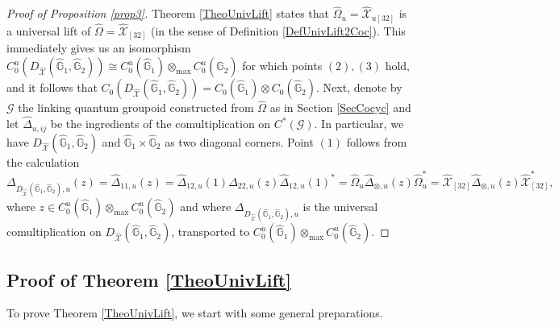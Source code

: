 \documentclass[reqno]{amsart}
\numberwithin{equation}{section}
\newcommand{\G}{\mathbb{G}}
\newcommand{\msG}{\mathscr{G}}
\newcommand{\mc}{\mathcal}
\newcommand{\wh}{\widehat}
\begin{document}
\begin{proof}[Proof of Proposition \ref{prop3}]
Theorem \ref{TheoUnivLift} states that $\hat{\Omega}_u=\wh{\mc{X}}_{u[32]}$ is a universal lift of $\hat{\Omega}=\hat{\mc{X}}_{[32]}$ (in the sense of Definition \ref{DefUnivLift2Coc}). This immediately gives us an isomorphism $C_0^u( D_{\wh{\mc{X}}}(\hat{\G}_1,\hat{\G}_2) )\cong C^u_0(\hat{\G}_1)\otimes_{\max} C^u_0(\hat{\G}_2)$ for which points $(2),(3)$ hold, and it follows that $C_0 (D_{\wh{\mc{X}}}(\hat{\G}_1,\hat{\G}_2))=C_{0}(\hat{\G}_1)\otimes C_{0}(\hat{\G}_2)$. Next, denote by $\msG$ the linking quantum groupoid constructed from $\hat{\Omega}$ as in Section \ref{SecCocyc} and let $\hat{\Delta}_{u,ij}$ be the ingredients of the comultiplication on $C^*(\msG)$. In particular, we have $D_{\wh{\mc{X}}}(\hat{\G}_1,\hat{\G}_2)$ and $\hat{\G}_1\times \hat{\G}_2$ as two diagonal corners. Point $(1)$ follows from the calculation
\[
\Delta_{D_{\wh{\mc{X}}}(\hat{\G}_1,\hat{\G}_2),u}(z)=
\hat{\Delta}_{11,u}(z)=
\hat{\Delta}_{12,u}(1)
\hat{\Delta}_{22,u}(z)
\hat{\Delta}_{12,u}(1)^*=
\hat{\Omega}_u\hat{\Delta}_{\otimes,u}(z)
\hat{\Omega}_{u}^*=
\wh{\mc{X}}_{[32]}\hat{\Delta}_{\otimes,u}(z)
\wh{\mc{X}}_{[32]}^*,
\]
where $z\in C_0^u(\hat{\G}_1)\otimes_{\max} C_0^u(\hat{\G}_2)$ and where $\Delta_{D_{\wh{\mc{X}}}(\hat{\G}_1,\hat{\G}_2),u}$ is the universal comultiplication on $D_{\wh{\mc{X}}}(\hat{\G}_1,\hat{\G}_2)$, transported to $C_0^u(\hat{\G}_1)\otimes_{\max} C_0^u(\hat{\G}_2)$.
\end{proof}

\subsection{Proof of Theorem \ref{TheoUnivLift}}\label{SecProofTech}

To prove Theorem \ref{TheoUnivLift}, we start with some general preparations.
\end{document}

